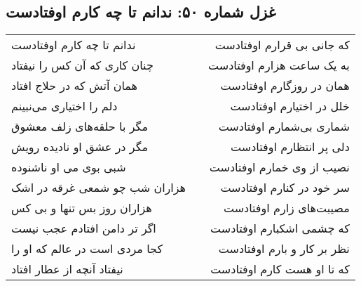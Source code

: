 \begin{center}
\section*{غزل شماره ۵۰: ندانم تا چه کارم اوفتادست}
\label{sec:050}
\begin{longtable}{l p{0.5cm} r}
ندانم تا چه کارم اوفتادست
&&
که جانی بی قرارم اوفتادست
\\
چنان کاری که آن کس را نیفتاد
&&
به یک ساعت هزارم اوفتادست
\\
همان آتش که در حلاج افتاد
&&
همان در روزگارم اوفتادست
\\
دلم را اختیاری می‌نبینم
&&
خلل در اختیارم اوفتادست
\\
مگر با حلقه‌های زلف معشوق
&&
شماری بی‌شمارم اوفتادست
\\
مگر در عشق او نادیده رویش
&&
دلی پر انتظارم اوفتادست
\\
شبی بوی می او ناشنوده
&&
نصیب از وی خمارم اوفتادست
\\
هزاران شب چو شمعی غرقه در اشک
&&
سر خود در کنارم اوفتادست
\\
هزاران روز بس تنها و بی کس
&&
مصیبت‌های زارم اوفتادست
\\
اگر تر دامن افتادم عجب نیست
&&
که چشمی اشکبارم اوفتادست
\\
کجا مردی است در عالم که او را
&&
نظر بر کار و بارم اوفتادست
\\
نیفتاد آنچه از عطار افتاد
&&
که تا او هست کارم اوفتادست
\\
\end{longtable}
\end{center}
